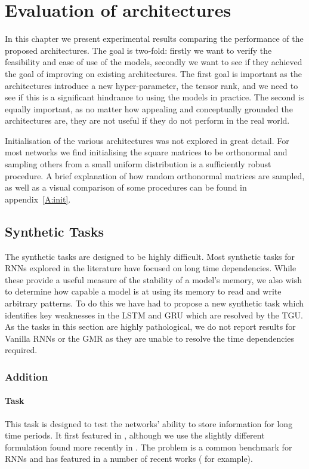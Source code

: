 
\chapter{Evaluation of architectures}\label{C:exps}
In this chapter we present experimental results comparing the performance of the proposed architectures.
The goal is two-fold: firstly we want to verify the feasibility and ease of use of the models, secondly
we want to see if they achieved the goal of improving on existing architectures. The first goal is
important as the architectures introduce a new hyper-parameter, the tensor rank, and we need to see if
this is a significant hindrance to using the models in practice. The second is equally important, as no
matter how appealing and conceptually grounded the architectures are, they are not useful if they do
not perform in the real world.

Initialisation of the various architectures was not explored in great detail. For most networks we
find initialising the square matrices to be orthonormal and sampling others from a small uniform
distribution is a sufficiently robust procedure. A brief explanation of how random orthonormal
matrices are sampled, as well as a visual comparison of some procedures can be found in
appendix~\ref{A:init}.

\section{Synthetic Tasks}
The synthetic tasks are designed to be highly difficult. Most synthetic tasks for RNNs explored in
the literature have focused on long time dependencies. While these provide a useful measure of the
stability of a model's memory, we also wish to determine how capable a model is at using its memory to
read and write arbitrary patterns. To do this we have had to propose a new synthetic task which identifies
key weaknesses in the LSTM and GRU which are resolved by the TGU. As the tasks in this section are
highly pathological, we do not report results for Vanilla RNNs or the GMR as they are unable to resolve
the time dependencies required.

\subsection{Addition}\label{sec:addition}
\subsubsection{Task}
This task is designed to test the networks' ability to store information for long time periods. It first
featured in \autocite{Hochreiter1997}, although we use the slightly different formulation found more 
recently in \autocite{Le2015}. The problem is a common benchmark for RNNs and has featured in a number of
recent works (\autocite{Arjovsky2015, Henaff2016, Barone2016, Neyshabur2016} for example).

